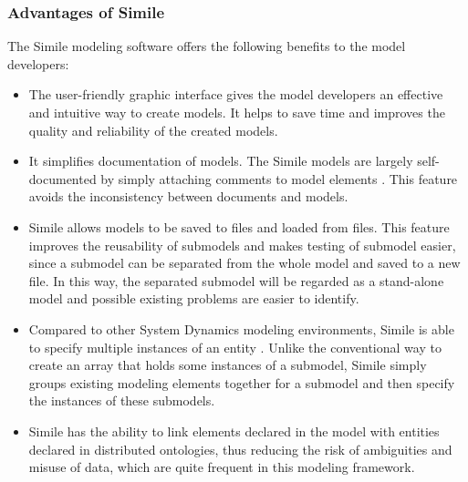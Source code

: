 \subsubsection{Advantages of Simile}
\par
The Simile modeling software offers the following benefits to the model developers:

\begin{itemize}
\item 
The user-friendly graphic interface gives the model developers an effective and intuitive way to create models. It helps to save time and improves the quality and reliability of the created models.
\item
It simplifies documentation of models. The Simile models are largely self-documented by simply attaching comments to model elements \autocite{dsl:simile-muetzelfeldt}. This feature avoids the inconsistency between documents and models. 
\item
Simile allows models to be saved to files and loaded from files. This feature improves the reusability of submodels and makes testing of submodel easier, since a submodel can be separated from the whole model and saved to a new file. In this way, the separated submodel will be regarded as a stand-alone model and possible existing problems are easier to identify.
\item
Compared to other System Dynamics modeling environments, Simile is able to specify multiple instances of an entity \autocite{dsl:simile-muetzelfeldt}. Unlike the conventional way to create an array that holds some instances of a submodel, Simile simply groups existing modeling elements together for a submodel and then specify the instances of these submodels.
\item 
Simile has the ability to link elements declared in the model with entities declared in distributed ontologies, thus reducing the risk of ambiguities and misuse of data, which are quite frequent in this modeling framework.
\end{itemize}

